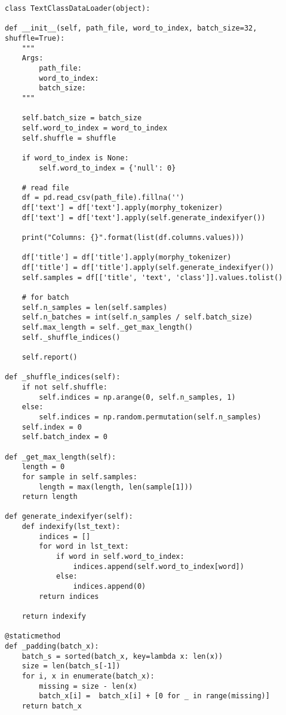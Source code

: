 \begin{verbatim}
class TextClassDataLoader(object):

def __init__(self, path_file, word_to_index, batch_size=32, shuffle=True):
    """
    Args:
        path_file:
        word_to_index:
        batch_size:
    """

    self.batch_size = batch_size
    self.word_to_index = word_to_index
    self.shuffle = shuffle
    
    if word_to_index is None:
        self.word_to_index = {'null': 0}

    # read file
    df = pd.read_csv(path_file).fillna('')
    df['text'] = df['text'].apply(morphy_tokenizer)
    df['text'] = df['text'].apply(self.generate_indexifyer())
    
    print("Columns: {}".format(list(df.columns.values)))
    
    df['title'] = df['title'].apply(morphy_tokenizer)
    df['title'] = df['title'].apply(self.generate_indexifyer())
    self.samples = df[['title', 'text', 'class']].values.tolist()

    # for batch
    self.n_samples = len(self.samples)
    self.n_batches = int(self.n_samples / self.batch_size)
    self.max_length = self._get_max_length()
    self._shuffle_indices()

    self.report()

def _shuffle_indices(self):
    if not self.shuffle:
        self.indices = np.arange(0, self.n_samples, 1)
    else:
        self.indices = np.random.permutation(self.n_samples)
    self.index = 0
    self.batch_index = 0

def _get_max_length(self):
    length = 0
    for sample in self.samples:
        length = max(length, len(sample[1]))
    return length

def generate_indexifyer(self):
    def indexify(lst_text):
        indices = []
        for word in lst_text:
            if word in self.word_to_index:
                indices.append(self.word_to_index[word])
            else:
                indices.append(0)
        return indices

    return indexify

@staticmethod
def _padding(batch_x):
    batch_s = sorted(batch_x, key=lambda x: len(x))
    size = len(batch_s[-1])
    for i, x in enumerate(batch_x):
        missing = size - len(x)
        batch_x[i] =  batch_x[i] + [0 for _ in range(missing)]
    return batch_x


\end{verbatim}
